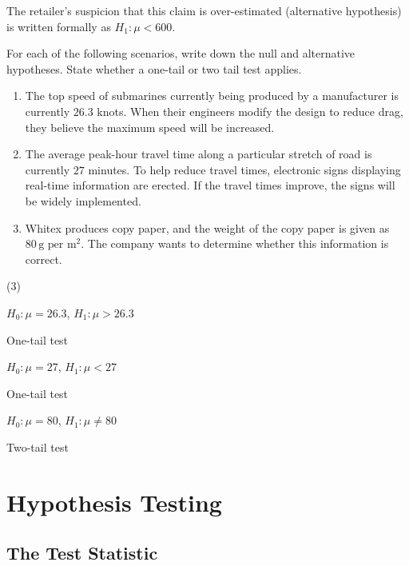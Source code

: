 \documentclass[11pt,a4paper]{book}
\begin{document}
The retailer's suspicion that this claim is over-estimated (alternative
hypothesis) is written formally as $H_{1}:\mu<600$.

\begin{example}

For each of the following scenarios, write down the null and alternative
hypotheses. State whether a one-tail or two tail test applies.

\begin{enumerate}[label=(\alph*)]

\item  The top speed of submarines currently being produced by a
manufacturer is currently $26.3$ knots. When their engineers modify
the design to reduce drag, they believe the maximum speed will be
increased.

\item  The average peak-hour travel time along a particular stretch
of road is currently $27$ minutes. To help reduce travel times, electronic
signs displaying real-time information are erected. If the travel
times improve, the signs will be widely implemented.

\item  Whitex produces copy paper, and the weight of the copy paper
is given as $80\,\text{g per m}^{2}$. The company wants to determine
whether this information is correct.

\end{enumerate}

\Solution

\begin{tasks}[label=(\alph*),label-width=3.5ex](3)

\task  $H_{0}:\mu=26.3$, $H_{1}:\mu>26.3$

One-tail test

\task  $H_{0}:\mu=27$, $H_{1}:\mu<27$

One-tail test

\task  $H_{0}:\mu=80$, $H_{1}:\mu\neq80$

Two-tail test

\end{tasks}

\end{example}

\section{Hypothesis Testing}

\subsection{The Test Statistic}
\end{document}
